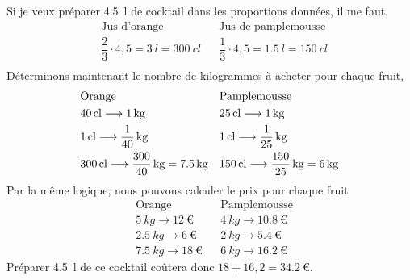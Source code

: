\documentclass[a4paper,fontsize=12pt, parskip=half]{scrartcl}
\begin{document}
\begin{solution}
    Si je veux préparer \SI{4,5}{l} de cocktail dans les proportions données,
    il me faut,
    \begin{align*}
         & \text{Jus d'orange}                               &  & \text{Jus de pamplemousse}                         \\
         & \dfrac{2}{3}\cdot 4,5  = \SI{3}{l} = \SI{300}{cl} &  & \dfrac{1}{3}\cdot 4,5 = \SI{1,5}{l} = \SI{150}{cl} \\
    \end{align*}
    Déterminons maintenant le nombre de kilogrammes à acheter pour chaque fruit,
    \begin{align*}
         & \text{Orange}                                                                        &  & \text{Pamplemousse}                                                                \\
         & \SI{40}{cl}\longrightarrow\SI{1}{kg}                                                 &  & \SI{25}{cl}\longrightarrow\SI{1}{kg}                                               \\
         & \SI{1}{cl}\longrightarrow\SI[parse-numbers=false]{\frac{1}{40}}{kg}                  &  & \SI{1}{cl}\longrightarrow\SI[parse-numbers=false]{\frac{1}{25}}{kg}                \\
         & \SI{300}{cl}\longrightarrow\SI[parse-numbers=false]{\frac{300}{40}}{kg}=\SI{7,5}{kg} &  & \SI{150}{cl}\longrightarrow\SI[parse-numbers=false]{\frac{150}{25}}{kg}=\SI{6}{kg} \\
    \end{align*}
    Par la même logique, nous pouvons calculer le prix pour chaque fruit
    \begin{align*}
         & \text{Orange}                         &  & \text{Pamplemousse}                   \\
         & \SI{5}{kg}\longrightarrow\SI{12}{€}   &  & \SI{4}{kg}\longrightarrow\SI{10,8}{€} \\
         & \SI{2,5}{kg}\longrightarrow\SI{6}{€}  &  & \SI{2}{kg}\longrightarrow\SI{5,4}{€}  \\
         & \SI{7,5}{kg}\longrightarrow\SI{18}{€} &  & \SI{6}{kg}\longrightarrow\SI{16,2}{€}
    \end{align*}
    Préparer \SI{4,5}{l} de ce cocktail coûtera donc $18+16,2=\SI{34,2}{€}$.
\end{solution}

\newpage
\printsolutions
\end{document}
